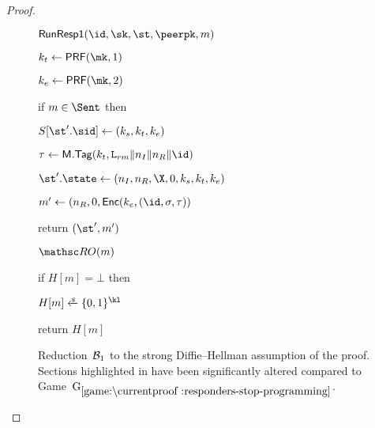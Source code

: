 \begin{proof}
\begin{figure}[tp]
{\begin{minipage}[t]{0.49\textwidth}
\begin{oracle}{$\RunRespI(\id,\sk,\st,\peerpk,m)$}
        \item $\kt \gets \PRF(\mk,1)$
        \item $\ke \gets \PRF(\mk,2)$
        \item if $m \in \Sent$ then
        \item \hindent $\S[\st'.\sid] \gets (\ks,\kt,\ke)$
        \item $\tau \gets \MACScheme.\MACTag(\kt, \labelrm\|\nonce_I\|\nonce_R\|\id)$
        \item $\st'.\state \gets (\nonce_I,\nonce_R,\X,\Y,\ks,\kt, \ke)$
        \item $m' \gets (\nonce_R, \Y, \ENCEnc(\ke,(\id, \sigma, \tau))$
        \item return $(\st', m')$
      \end{oracle}
      
      \ExptSepSpace
      
      \begin{oracle}{$\RO(m)$}
      \item if $H[m] = \bot$ then
      \item \hindent $H[m] \sample \bits^{\kl}$
      \item \hindent {}
      \item \hindent {}
      \item \hindent {}
      \item \hindent \hindent {}
      \item \hindent \hindent {}
      \item \hindent \hindent \hindent {}
	\label{line:SIGMA-proof:game:advB1:program-Q-mk}
      \item \hindent \hindent \hindent {}
      \item return $H[m]$
    \end{oracle}
  \end{minipage}
  }

  \caption[]{%
      		Reduction~$\mathcal{B}_1$ to the strong Diffie--Hellman assumption of the \SIGMAI proof.
      		Sections highlighted in  have been significantly altered compared to Game~$\lblGm{responders-stop-programming}$.
  }
  \label{fig:SIGMAI-proof:game:advB1}
\end{figure}


\end{proof}
